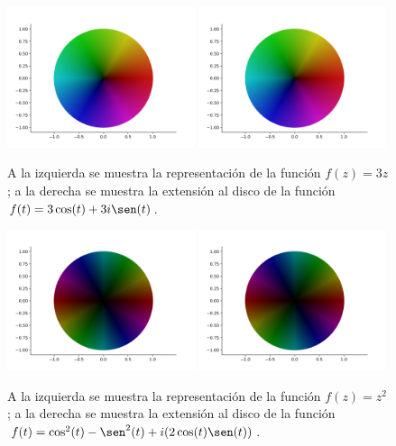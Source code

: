 \begin{figure}[H]
    \centering
    \includegraphics[width=0.49\textwidth]{../Aplicacion/3z.png}
    \hfill
    \includegraphics[width=0.49\textwidth]{../Aplicacion/3cos(t)+3isen(t).png}
    \caption{A la izquierda se muestra la representación de la función $f(z) = 3z$; a la derecha se muestra la extensión al disco de la función $f(t) = 3\cos(t) + 3i \sen(t)$.}
    \label{fig:comparacion2}
\end{figure}


\begin{figure}[H]
    \centering
    \includegraphics[width=0.49\textwidth]{../Aplicacion/z^2(2).png}
    \hfill
    \includegraphics[width=0.49\textwidth]{../Aplicacion/cos^2(t)-sen^2(t)+(2cos(t)sen(t))i.png}
    \caption{A la izquierda se muestra la representación de la función $f(z) = z^2$; a la derecha se muestra la extensión al disco de la función $f(t) = \cos^2(t) - \sen^2(t) + i (2 \cos(t) \sen(t))$.}
    \label{fig:comparacion3}
\end{figure}



